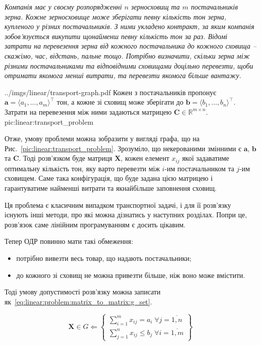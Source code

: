 \documentclass[\main/book.tex]{subfiles}
\begin{document}
\textit{Компанія має у своєму розпорядженні $n$ зерносховищ та $m$ постачальників зерна. Кожне зерносховище може зберігати певну кількість тон зерна, купленого у різних постачальників. З ними укладено контракт, за яким компанія зобов'язується викупити щонайменш певну кількість тон за раз. Відомі затрати на перевезення зерна від кожного постачальника до кожного сховища -- скажімо, час, відстань, пальне тощо. Потрібно визначити, скільки зерна між різними постачальниками та відповідними сховищами доцільно перевезти, щоби отримати якомога менші витрати, та перевезти якомога більше вантажу.}

\illustration
 {../imgs/linear/transport-graph.pdf}
 {Кожен з постачальників пропонує $\mathbf{a} = {\langle a_1, \ldots, a_m \rangle}^\top$ тон, а кожне зі сховищ може зберігати до $\mathbf{b} = {\langle b_1, \ldots, b_n \rangle}^\top$. Затрати на перевезення між ними задаються матрицею $\mathbf{C} \in \mathbb{R}^{m \times n}$.}
 {pic:linear:transport_problem}

Отже, умову проблеми можна зобразити у вигляді графа, що на Рис.~\ref{pic:linear:transport_problem}. Зрозуміло, що некерованими змінними є $\mathbf{a}$, $\mathbf{b}$ та $\mathbf{C}$. Тоді розв'язком буде матриця $\mathbf{X}$, кожен елемент $x_{ij}$ якої задаватиме \flqq{}оптимальну\frqq{} кількість тон, яку варто перевезти між $i$-им постачальником та $j$-им сховищем. Саме така конфігурація, що буде задана цією матрицею і гарантуватиме найменші витрати та якнайбільше заповнення сховищ.

\begin{note}
 Ця проблема є класичним випадком транспортної задачі, і для її розв'язку існують інші методи, про які можна дізнатись у наступних розділах. Попри це, розв'язок саме лінійним програмуванням є досить цікавим.
\end{note}

Тепер ОДР повинно мати такі обмеження:

\begin{itemize}
 \item потрібно вивезти весь товар, що надають постачальники;
 \item до кожного зі сховищ не можна привезти більше, ніж воно може вмістити.
\end{itemize}

Тоді умову допустимості розв'язку можна записати як~\ref{eq:linear:problem:matrix_to_matrix:g_set}.

\begin{equation}
 \mathbf{X} \in G \Leftarrow \left\{
 \begin{array}{l}
  \displaystyle
  \sum_{i=1}^m x_{ij} = a_i\; \forall j = \overline{1, n} \\
  \displaystyle
  \sum_{j=1}^n x_{ij} \leq b_j\; \forall i = \overline{1, m}
 \end{array}
 \right\}
 \label{eq:linear:problem:matrix_to_matrix:g_set}
\end{equation}
\end{document}
